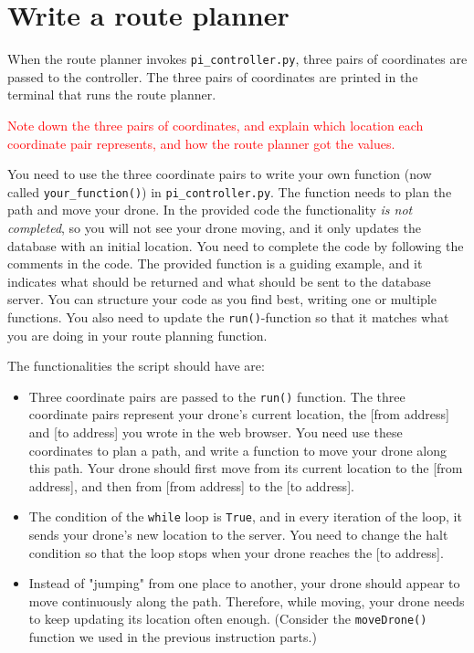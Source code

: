 \documentclass{article}
\begin{document}
\section{Write a route planner}

When the route planner invokes \verb!pi_controller.py!, three pairs of coordinates are passed to the controller. The three pairs of coordinates are printed in the terminal that runs the route planner.

\vspace{0.5cm}
\parbox[t]{13cm}{\textcolor{red}{Note down the three pairs of coordinates, and explain which location each coordinate pair represents, and how the route planner got the values.} } \vspace{0.5cm}

You need to use the three coordinate pairs to write your own function (now called \verb!your_function()!) in \verb!pi_controller.py!. The function needs to plan the path and move your drone. In the provided code the functionality \textit{is not completed}, so you will not see your drone moving, and it only updates the database with an initial location. You need to complete the code by following the comments in the code. The provided function is a guiding example, and it indicates what should be returned and what should be sent to the database server. You can structure your code as you find best, writing one or multiple functions. You also need to update the \verb!run()!-function so that it matches what you are doing in your route planning function.

The functionalities the script should have are:
\begin{itemize}
    \item Three coordinate pairs are passed to the \texttt{run()} function. The three coordinate pairs represent your drone's current location, the [from address] and [to address] you wrote in the web browser. You need use these coordinates to plan a path, and write a function to move your drone along this path. Your drone should first move from its current location to the [from address], and then from [from address] to the [to address].
    \item The condition of the \verb!while! loop is \verb!True!, and in every iteration of the loop, it sends your drone's new location to the server. You need to change the halt condition so that the loop stops when your drone reaches the [to address].
    \item Instead of "jumping" from one place to another, your drone should appear to move continuously along the path. Therefore, while moving, your drone needs to keep updating its location often enough. (Consider the \verb!moveDrone()! function we used in the previous instruction parts.)
\end{itemize}
\end{document}
